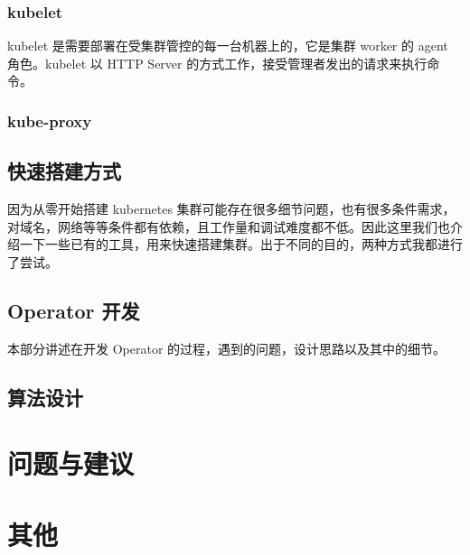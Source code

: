 \subsubsection*{kubelet}

kubelet 是需要部署在受集群管控的每一台机器上的，它是集群 worker 的 agent 角色。kubelet 以 HTTP Server 的方式工作，接受管理者发出的请求来执行命令。

\subsubsection*{kube-proxy}

\subsection{快速搭建方式}

因为从零开始搭建 kubernetes 集群可能存在很多细节问题，也有很多条件需求，对域名，网络等等条件都有依赖，且工作量和调试难度都不低。因此这里我们也介绍一下一些已有的工具，用来快速搭建集群。出于不同的目的，两种方式我都进行了尝试。

\subsection{Operator 开发}

本部分讲述在开发 Operator 的过程，遇到的问题，设计思路以及其中的细节。

\subsection{算法设计}

\section{问题与建议}

\section{其他}
